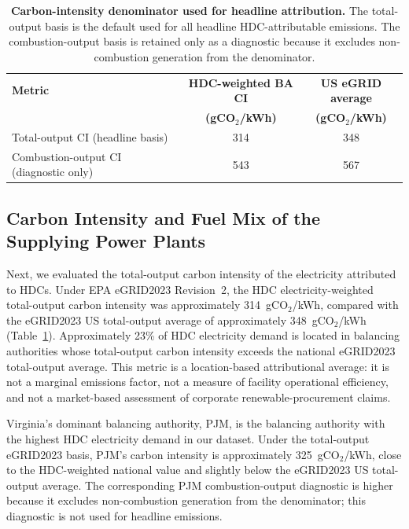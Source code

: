 \documentclass[12pt]{article}
\begin{document}
\begin{table}[htbp]
\centering
\small
\caption{\textbf{Carbon-intensity denominator used for headline attribution.} The total-output basis is the default used for all headline HDC-attributable emissions. The combustion-output basis is retained only as a diagnostic because it excludes non-combustion generation from the denominator.}
\label{tab:ci_basis_main}
\begin{tabular}{lcc}
\toprule
\textbf{Metric} & \textbf{HDC-weighted BA CI} & \textbf{US eGRID average} \\
 & \textbf{(gCO$_2$/kWh)} & \textbf{(gCO$_2$/kWh)} \\
\midrule
Total-output CI (headline basis) & 314 & 348 \\
Combustion-output CI (diagnostic only) & 543 & 567 \\
\bottomrule
\end{tabular}
\end{table}

\subsection*{Carbon Intensity and Fuel Mix of the Supplying Power Plants}

Next, we evaluated the total-output carbon intensity of the electricity attributed to HDCs. Under EPA eGRID2023 Revision~2, the HDC electricity-weighted total-output carbon intensity was approximately 314~gCO$_2$/kWh, compared with the eGRID2023 US total-output average of approximately 348~gCO$_2$/kWh (Table~\ref{tab:ci_basis_main}). Approximately 23\% of HDC electricity demand is located in balancing authorities whose total-output carbon intensity exceeds the national eGRID2023 total-output average. This metric is a location-based attributional average: it is not a marginal emissions factor, not a measure of facility operational efficiency, and not a market-based assessment of corporate renewable-procurement claims.

Virginia's dominant balancing authority, PJM, is the balancing authority with the highest HDC electricity demand in our dataset. Under the total-output eGRID2023 basis, PJM's carbon intensity is approximately 325~gCO$_2$/kWh, close to the HDC-weighted national value and slightly below the eGRID2023 US total-output average. The corresponding PJM combustion-output diagnostic is higher because it excludes non-combustion generation from the denominator; this diagnostic is not used for headline emissions.
\end{document}
